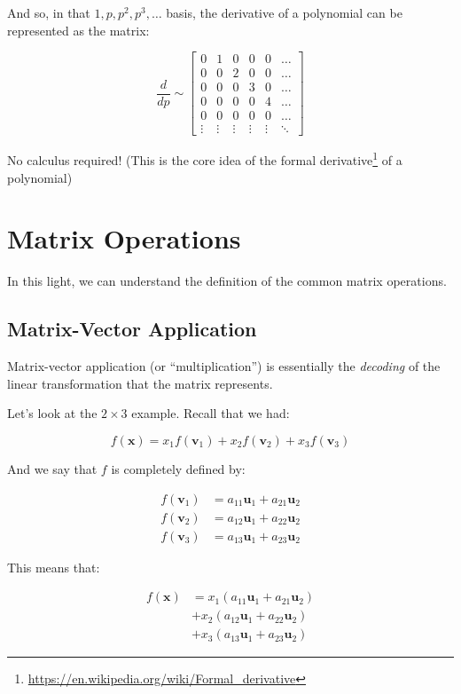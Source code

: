 \documentclass[]{article}
\renewcommand{\href}[2]{#2\footnote{\url{#1}}}
\begin{document}
And so, in that \(1, p, p^2, p^3, \ldots\) basis, the derivative of a polynomial
can be represented as the matrix:

\[
\frac{d}{dp}
\sim
\begin{bmatrix}
0 & 1 & 0 & 0 & 0 & \ldots \\
0 & 0 & 2 & 0 & 0 & \ldots \\
0 & 0 & 0 & 3 & 0 & \ldots \\
0 & 0 & 0 & 0 & 4 & \ldots \\
0 & 0 & 0 & 0 & 0 & \ldots \\
\vdots & \vdots & \vdots & \vdots & \vdots & \ddots
\end{bmatrix}
\]

No calculus required! (This is the core idea of the
\href{https://en.wikipedia.org/wiki/Formal_derivative}{formal derivative} of a
polynomial)

\section{Matrix Operations}\label{matrix-operations}

In this light, we can understand the definition of the common matrix operations.

\subsection{Matrix-Vector Application}\label{matrix-vector-application}

Matrix-vector application (or ``multiplication'') is essentially the
\emph{decoding} of the linear transformation that the matrix represents.

Let's look at the \(2 \times 3\) example. Recall that we had:

\[
f(\mathbf{x}) = x_1 f(\mathbf{v}_1) + x_2 f(\mathbf{v}_2) + x_3 f(\mathbf{v}_3)
\]

And we say that \(f\) is completely defined by:

\[
\begin{aligned}
f(\mathbf{v}_1) & = a_{11} \mathbf{u}_1 + a_{21} \mathbf{u}_2 \\
f(\mathbf{v}_2) & = a_{12} \mathbf{u}_1 + a_{22} \mathbf{u}_2 \\
f(\mathbf{v}_3) & = a_{13} \mathbf{u}_1 + a_{23} \mathbf{u}_2
\end{aligned}
\]

This means that:

\[
\begin{aligned}
f(\mathbf{x}) & = x_1 (a_{11} \mathbf{u}_1 + a_{21} \mathbf{u}_2) \\
              & + x_2 (a_{12} \mathbf{u}_1 + a_{22} \mathbf{u}_2) \\
              & + x_3 (a_{13} \mathbf{u}_1 + a_{23} \mathbf{u}_2)
\end{aligned}
\]
\end{document}
